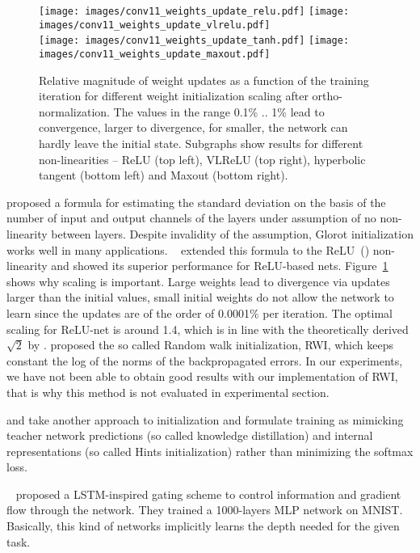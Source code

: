\documentclass{article} \clearpage{}\usepackage{iclr2016_conference,times}
\begin{document}
\begin{figure}[tb]
\centering
\texttt{[image: images/conv11\_weights\_update\_relu.pdf]}
\texttt{[image: images/conv11\_weights\_update\_vlrelu.pdf]}\\
\texttt{[image: images/conv11\_weights\_update\_tanh.pdf]}
\texttt{[image: images/conv11\_weights\_update\_maxout.pdf]}
\caption{Relative magnitude of weight updates as a function of the training iteration for different weight initialization scaling after ortho-normalization. The values in the range 0.1\% .. 1\% lead to convergence, larger to divergence, for smaller, the network  can hardly leave  the initial state. Subgraphs show results for different non-linearities -- ReLU (top left), VLReLU (top right), hyperbolic tangent (bottom left) and Maxout (bottom right).}
\label{fig:weights-scaling}
\end{figure}

\cite{Xavier10} proposed a formula for estimating the standard deviation on the basis of the number of input and output channels of the layers under assumption of no non-linearity between layers. Despite invalidity of the  assumption, Glorot initialization works well in many applications. 
~\cite{MSRA2015} extended this formula to the ReLU~(\cite{ReLU2011}) non-linearity and showed its superior performance for ReLU-based nets. 
Figure~\ref{fig:weights-scaling} shows why scaling is important. Large weights lead to divergence via updates larger than the initial values, small initial weights do not allow the network to learn since the updates are of the order of 0.0001$\%$ per iteration. The optimal scaling for ReLU-net is around 1.4, which is in line with the theoretically derived $\sqrt{2}$ by \cite{MSRA2015}. 
\cite{Sussillo2014}  proposed the so called Random walk initialization, RWI, which keeps constant the log of the norms of the backpropagated errors. In our experiments, we have not been able to obtain good results with our implementation of RWI, that is why this method is not evaluated in experimental section.

\cite{KDHinton2015} and \cite{FitNets2014} take another approach to initialization and formulate training as mimicking teacher network predictions (so called knowledge distillation) and internal representations (so called Hints initialization) rather than minimizing the softmax loss.

~\cite{Highway2015} proposed a LSTM-inspired gating scheme to control information and gradient flow through the network. They trained a 1000-layers MLP network on MNIST. Basically, this kind of networks implicitly learns the depth needed for the 
given task. 
\end{document}
